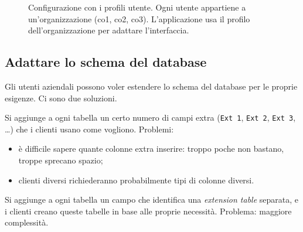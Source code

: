 \begin{figure}[ht]
\centering
{}
\caption{Configurazione con i profili utente. Ogni utente appartiene a un'organizzazione (co1, co2, co3). L'applicazione
usa il profilo dell'organizzazione per adattare l'interfaccia.}
\label{fig:cloud-profili}
\end{figure}

\subsection{Adattare lo schema del database}
\label{sec:cloud-schema}

Gli utenti aziendali possono voler estendere lo schema del database per le proprie esigenze. Ci sono due soluzioni.

\begin{description}[leftmargin=0pt, style=unboxed]
  \item[Soluzione I: colonne extra.] Si aggiunge a ogni tabella un certo numero di campi extra (\texttt{Ext 1},
    \texttt{Ext 2}, \texttt{Ext 3}, \dots) che i clienti usano come vogliono. Problemi:
    \begin{itemize}
      \item è difficile sapere quante colonne extra inserire: troppo poche non bastano, troppe sprecano spazio;
      \item clienti diversi richiederanno probabilmente tipi di colonne diversi.
    \end{itemize}
  \item[Soluzione II: extension table.] Si aggiunge a ogni tabella un campo che identifica una \emph{extension
    table} separata, e i clienti creano queste tabelle in base alle proprie necessità. Problema: maggiore
    complessità.
\end{description}

